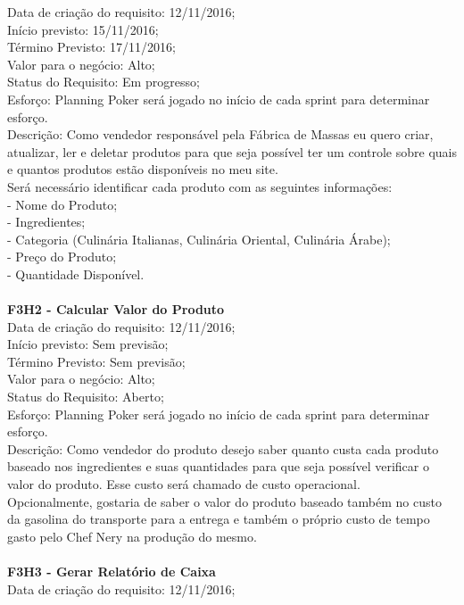 \begin{apendicesenv}
\tab Data de criação do requisito: 12/11/2016;\\
\tab Início previsto: 15/11/2016;\\
\tab Término Previsto: 17/11/2016;\\
\tab Valor para o negócio: Alto;\\
\tab Status do Requisito: Em progresso;\\
\tab Esforço: Planning Poker será jogado no início de cada sprint para determinar esforço.\\
\tab Descrição: Como vendedor responsável pela Fábrica de Massas eu quero criar, atualizar, ler e deletar produtos para que seja possível ter um controle sobre quais e quantos produtos estão disponíveis no meu site.\\
\tab Será necessário identificar cada produto com as seguintes informações:\\
\tab - Nome do Produto;\\
\tab - Ingredientes;\\
\tab - Categoria (Culinária Italianas, Culinária Oriental, Culinária Árabe);\\
\tab - Preço do Produto;\\
\tab - Quantidade Disponível.\\
\\
\textbf{F3H2 - Calcular Valor do Produto}\\
\tab Data de criação do requisito: 12/11/2016;\\
\tab Início previsto: Sem previsão;\\
\tab Término Previsto: Sem previsão;\\
\tab Valor para o negócio: Alto;\\
\tab Status do Requisito: Aberto;\\
\tab Esforço: Planning Poker será jogado no início de cada sprint para determinar esforço.\\
\tab Descrição: Como vendedor do produto desejo saber quanto custa cada produto baseado nos ingredientes e suas quantidades para que seja possível verificar o valor do produto. Esse custo será chamado de custo operacional.\\
\tab Opcionalmente, gostaria de saber o valor do produto baseado também no custo da gasolina do transporte para a entrega e também o próprio custo de tempo gasto pelo Chef Nery na produção do mesmo.\\
\\ 
\textbf{F3H3 - Gerar Relatório de Caixa}\\
\tab Data de criação do requisito: 12/11/2016;\\

\end{apendicesenv}
